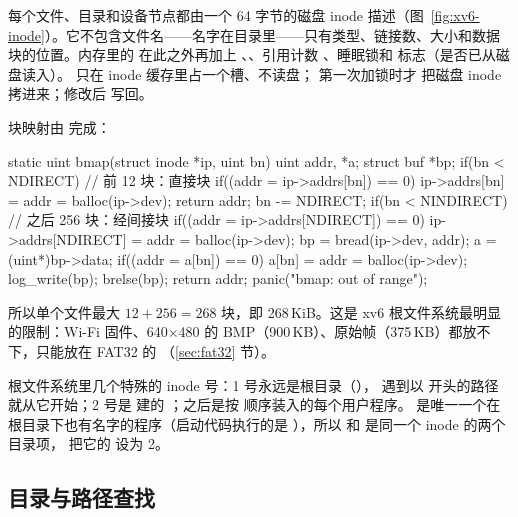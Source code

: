 每个文件、目录和设备节点都由一个 64 字节的磁盘 inode 描述（图~\ref{fig:xv6-inode}）。它不包含文件名——名字在目录里——只有类型、链接数、大小和数据块的位置。内存里的  在此之外再加上 、、引用计数 、睡眠锁和  标志（是否已从磁盘读入）。 只在 inode 缓存里占一个槽、不读盘； 第一次加锁时才  把磁盘 inode 拷进来；修改后  写回。

块映射由  完成：

\begin{ccode}
static uint bmap(struct inode *ip, uint bn) {
  uint addr, *a;
  struct buf *bp;
  if(bn < NDIRECT){                                   // 前 12 块：直接块
    if((addr = ip->addrs[bn]) == 0)
      ip->addrs[bn] = addr = balloc(ip->dev);
    return addr;
  }
  bn -= NDIRECT;
  if(bn < NINDIRECT){                                 // 之后 256 块：经间接块
    if((addr = ip->addrs[NDIRECT]) == 0)
      ip->addrs[NDIRECT] = addr = balloc(ip->dev);
    bp = bread(ip->dev, addr);
    a = (uint*)bp->data;
    if((addr = a[bn]) == 0){
      a[bn] = addr = balloc(ip->dev);
      log_write(bp);
    }
    brelse(bp);
    return addr;
  }
  panic("bmap: out of range");
}
\end{ccode}

所以单个文件最大 $12+256=268$ 块，即 268\,KiB。这是 xv6 根文件系统最明显的限制：Wi-Fi 固件、640$\times$480 的 BMP（900\,KB）、原始帧（375\,KB）都放不下，只能放在 FAT32 的 （\ref{sec:fat32} 节）。

根文件系统里几个特殊的 inode 号：1 号永远是根目录（）， 遇到以 \code{/} 开头的路径就从它开始；2 号是  建的 ；之后是按  顺序装入的每个用户程序。 是唯一一个在根目录下也有名字的程序（启动代码执行的是 ），所以  和  是同一个 inode 的两个目录项， 把它的  设为 2。

\subsection{目录与路径查找}

